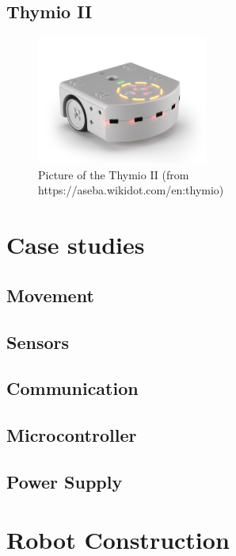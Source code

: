 \documentclass[twocolumn]{article}
\begin{document}
\subsection{Thymio II}
\begin{figure}[h!]
  \centering
  \includegraphics[width=0.5\textwidth]{images/thymioii.jpg}
  \caption{Picture of the Thymio II (from https://aseba.wikidot.com/en:thymio)}
\end{figure}


\section{Case studies}
\subsection{Movement}
\subsection{Sensors}
\subsection{Communication}
\subsection{Microcontroller}
\subsection{Power Supply}

\section{Robot Construction}



\nocite{*}

\printbibliography[maxnames=25]
\end{document}
